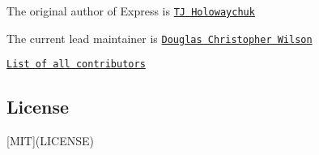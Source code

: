 The original author of Express is \href{https://github.com/tj}{\tt TJ Holowaychuk} \href{https://gratipay.com/visionmedia/}{\tt }

The current lead maintainer is \href{https://github.com/dougwilson}{\tt Douglas Christopher Wilson} \href{https://gratipay.com/dougwilson/}{\tt }

\href{https://github.com/expressjs/express/graphs/contributors}{\tt List of all contributors}

\subsection*{License}

\mbox{[}M\+IT\mbox{]}(L\+I\+C\+E\+N\+SE) 